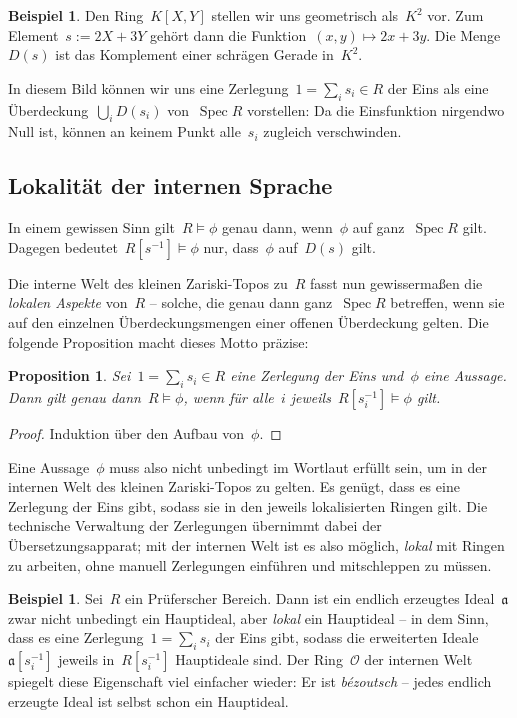 \documentclass[a4paper,ngerman,12pt]{scrartcl}
\theoremstyle{definition}
\newtheorem{bsp}[defn]{Beispiel}
\theoremstyle{plain}
\newtheorem{prop}[defn]{Proposition}
\theoremstyle{remark}
\renewcommand{\aa}{\mathfrak{a}}
\renewcommand{\O}{\mathcal{O}}
\DeclareMathOperator{\Spec}{Spec}
\renewcommand{\_}{\mathpunct{.}\,}
\newcommand{\?}{\,{:}\,}
\begin{document}
\begin{bsp}Den Ring~$K[X,Y]$ stellen wir uns geometrisch als~$K^2$ vor. Zum
Element~$s := 2X+3Y$ gehört dann die Funktion~$(x,y) \mapsto 2x+3y$. Die
Menge~$D(s)$ ist das Komplement einer schrägen Gerade in~$K^2$.\end{bsp}

In diesem Bild können wir uns eine Zerlegung~$1 = \sum_i s_i \in R$ der Eins
als eine Über\-dec\-kung~$\bigcup_i D(s_i)$ von~$\Spec R$ vorstellen: Da die
Einsfunktion nirgendwo Null ist, können an keinem Punkt alle~$s_i$ zugleich
verschwinden.


\subsection{Lokalität der internen Sprache}

In einem gewissen Sinn gilt~$R \models \phi$ genau dann, wenn~$\phi$ auf ganz~$\Spec R$
gilt. Dagegen bedeutet~$R[s^{-1}] \models \phi$ nur, dass~$\phi$ auf~$D(s)$
gilt.

Die interne Welt des kleinen Zariski-Topos zu~$R$ fasst nun gewissermaßen die
\emph{lokalen Aspekte} von~$R$ -- solche, die genau dann ganz~$\Spec R$
betreffen, wenn sie auf den einzelnen Überdeckungsmengen einer offenen
Überdeckung gelten. Die folgende Proposition macht dieses Motto präzise:
\begin{prop}Sei~$1 = \sum_i s_i \in R$ eine Zerlegung der Eins und~$\phi$ eine
Aussage. Dann gilt genau dann~$R \models \phi$, wenn für alle~$i$
jeweils~$R[s_i^{-1}] \models \phi$ gilt.\end{prop}
\begin{proof}Induktion über den Aufbau von~$\phi$.\end{proof}

Eine Aussage~$\phi$ muss also nicht unbedingt im Wortlaut erfüllt sein, um in
der internen Welt des kleinen Zariski-Topos zu gelten. Es genügt, dass es
eine Zerlegung der Eins gibt, sodass sie in den jeweils lokalisierten Ringen gilt.
Die technische Verwaltung der Zerlegungen übernimmt dabei der
Übersetzungsapparat; mit der internen Welt ist es also möglich, \emph{lokal}
mit Ringen zu arbeiten, ohne manuell Zerlegungen einführen und mitschleppen
zu müssen.

\begin{bsp}\label{lokal-hauptideale}%
Sei~$R$ ein Prüferscher Bereich. Dann ist ein endlich erzeugtes
Ideal~$\aa$ zwar nicht unbedingt ein Hauptideal, aber \emph{lokal} ein
Hauptideal -- in dem Sinn, dass es eine Zerlegung~$1 = \sum_i s_i$ der Eins
gibt, sodass die erweiterten Ideale~$\aa[s_i^{-1}]$ jeweils in~$R[s_i^{-1}]$
Hauptideale sind. Der Ring~$\O$ der internen Welt spiegelt diese Eigenschaft
viel einfacher wieder: Er ist \emph{bézoutsch} -- jedes endlich
erzeugte Ideal ist selbst schon ein Hauptideal.\end{bsp}
\end{document}
